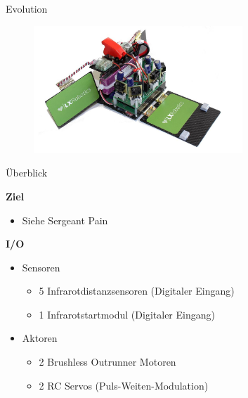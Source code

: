 \documentclass{beamer}
\begin{document}
\begin{frame}{Evolution}
 \begin{figure}[H]
  \centering
  \includegraphics[width=0.7\textwidth]{./images/robot-evolution.jpg}
 \end{figure}
\end{frame}
\begin{frame}{\"Uberblick}
\begin{large}\textbf{Ziel}\end{large}
\begin{itemize}
	\item Siehe Sergeant Pain
\end{itemize}
\vspace{1cm}
\begin{large}\textbf{I/O}\end{large}
\begin{itemize}
	\item Sensoren
	\begin{itemize}
		\item 5 Infrarotdistanzsensoren (Digitaler Eingang)
		\item 1 Infrarotstartmodul (Digitaler Eingang)
	\end{itemize}
	\item Aktoren
	\begin{itemize}
		\item 2 Brushless Outrunner Motoren
		\item 2 RC Servos (Puls-Weiten-Modulation)
	\end{itemize}
\end{itemize}
\end{frame}
\end{document}
